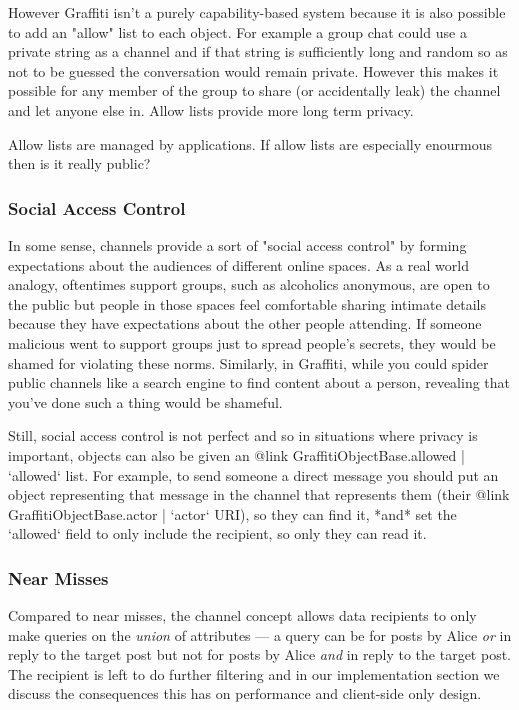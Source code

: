 However Graffiti isn't a purely capability-based system because it
is also possible to add an "allow" list to each object.
For example a group chat could use a private string as a channel
and if that string is sufficiently long and random so as not to be guessed
the conversation would remain private.
However this makes it possible for any member of the group to share (or accidentally leak) the
channel and let anyone else in.
Allow lists provide more long term privacy.

Allow lists are managed by applications.
If allow lists are especially enourmous then is it really public?

\subsubsection{Social Access Control}

In some sense, channels provide a sort of "social access control" by forming
expectations about the audiences of different online spaces.
As a real world analogy, oftentimes support groups, such as alcoholics
anonymous, are open to the public but people in those spaces feel comfortable sharing intimate details
because they have expectations about the other people attending.
If someone malicious went to support groups just to spread people's secrets,
they would be shamed for violating these norms.
Similarly, in Graffiti, while you could spider public channels like a search engine
to find content about a person, revealing that you've done such a thing
would be shameful.

Still, social access control is not perfect and so in situations where privacy is important,
objects can also be given
an {@link GraffitiObjectBase.allowed | `allowed`} list.
For example, to send someone a direct message you should put an object representing
that message in the channel that represents them (their {@link GraffitiObjectBase.actor | `actor` URI}),
so they can find it, *and* set the `allowed` field to only include the recipient,
so only they can read it.

\subsubsection{Near Misses}

Compared to near misses, the channel concept allows data recipients to only make queries on the \emph{union} of attributes --- a query can be for posts by Alice \emph{or} in reply to the target post but not for posts by Alice \emph{and} in reply to the target post. The recipient is left to do further filtering and in our implementation section we discuss the consequences this has on performance and client-side only design.

